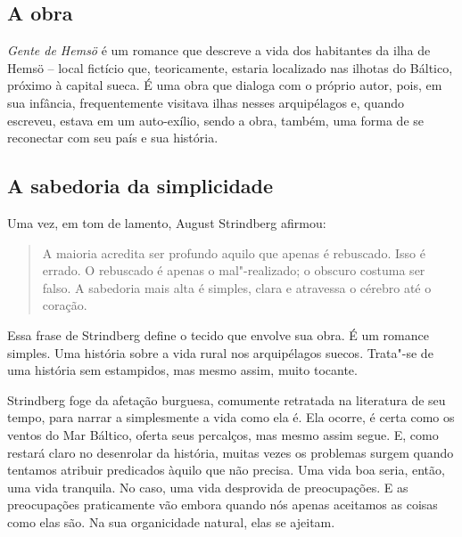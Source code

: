 \documentclass[12pt]{extarticle}
\begin{document}
\subsection{A obra}

\emph{Gente de Hemsö} é um romance que descreve a vida dos habitantes da 
ilha de Hemsö -- local fictício que, teoricamente, estaria localizado nas
ilhotas do Báltico, próximo à capital sueca. É uma obra que dialoga com
o próprio autor, pois, em sua infância, frequentemente visitava ilhas
nesses arquipélagos e, quando escreveu, estava em um auto-exílio, sendo
a obra, também, uma forma de se reconectar com seu país e sua história.




\subsection{A sabedoria da simplicidade}

Uma vez, em tom de lamento, August Strindberg afirmou:

\begin{quote}
A maioria acredita ser profundo aquilo que apenas é rebuscado. Isso é
errado. O rebuscado é apenas o mal"-realizado; o obscuro costuma ser
falso. A sabedoria mais alta é simples, clara e atravessa o cérebro até
o coração.
\end{quote}

Essa frase de Strindberg define o tecido que envolve sua obra. É um
romance simples. Uma história sobre a vida rural nos arquipélagos
suecos. Trata"-se de uma história sem estampidos, mas mesmo assim, muito
tocante.

Strindberg foge da afetação burguesa, comumente retratada na literatura
de seu tempo, para narrar a simplesmente a vida como ela é. Ela ocorre,
é certa como os ventos do Mar Báltico, oferta seus percalços, mas mesmo
assim segue. E, como restará claro no desenrolar da história, muitas
vezes os problemas surgem quando tentamos atribuir predicados àquilo que
não precisa. Uma vida boa seria, então, uma vida tranquila. No caso, uma
vida desprovida de preocupações. E as preocupações praticamente vão
embora quando nós apenas aceitamos as coisas como elas são. Na sua
organicidade natural, elas se ajeitam.


\end{document}

